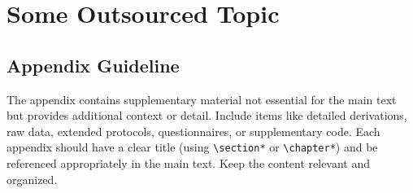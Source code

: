 \appendix

\chapter{Some Outsourced Topic}

\section{Appendix Guideline}

The appendix contains supplementary material not essential for the main text but provides additional context or detail. Include items like detailed derivations, raw data, extended protocols, questionnaires, or supplementary code. Each appendix should have a clear title (using \texttt{\textbackslash section*} or \texttt{\textbackslash chapter*}) and be referenced appropriately in the main text. Keep the content relevant and organized.



